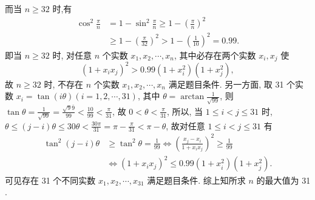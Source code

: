 而当 $n \geqslant 32$ 时,有
$$
\begin{aligned}
\cos ^2 \frac{\pi}{n} & =1-\sin ^2 \frac{\pi}{n} \geqslant 1-\left(\frac{\pi}{n}\right)^2 \\
& \geqslant 1-\left(\frac{\pi}{32}\right)^2>1-\left(\frac{1}{10}\right)^2=0.99 .
\end{aligned}
$$
即当 $n \geqslant 32$ 时, 对任意 $n$ 个实数 $x_1, x_2, \cdots, x_n$, 其中必存在两个实数 $x_i, x_j$ 使
$$
\left(1+x_i x_j\right)^2>0.99\left(1+x_i^2\right)\left(1+x_j^2\right),
$$
故 $n \geqslant 32$ 时, 不存在 $n$ 个实数 $x_1, x_2, \cdots, x_n$ 满足题目条件.
另一方面, 取 31 个实数 $x_i=\tan (i \theta)(i=1,2, \cdots, 31)$, 其中 $\theta= \arctan \frac{1}{\sqrt{99}}$, 则 $\tan \theta=\frac{1}{\sqrt{99}}=\frac{\sqrt{9} \overline{9}}{99}<\frac{10}{99}<\frac{\pi}{31}$, 故 $0<\theta<\frac{\pi}{31}$, 所以, 当 $1 \leqslant i<j \leqslant 31$ 时, $\theta \leqslant(j-i) \theta \leqslant 30 \theta<\frac{30 \pi}{31}=\pi-\frac{\pi}{31}<\pi-\theta$, 故对任意 $1 \leqslant i<j \leqslant 31$ 有
$$
\begin{aligned}
\tan ^2(j-i) \theta & \geqslant \tan ^2 \theta=\frac{1}{99} \Leftrightarrow\left(\frac{x_j-x_i}{1+x_i x_j}\right)^2 \geqslant \frac{1}{99} \\
& \Leftrightarrow\left(1+x_i x_j\right)^2 \leqslant 0.99\left(1+x_i^2\right)\left(1+x_j^2\right) .
\end{aligned}
$$
可见存在 31 个不同实数 $x_1, x_2, \cdots, x_{31}$ 满足题目条件.
综上知所求 $n$ 的最大值为 31 .




